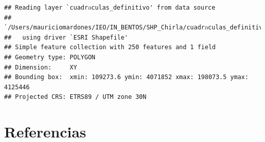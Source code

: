 \documentclass[
]{article}
\begin{document}
\begin{verbatim}
## Reading layer `cuadrกculas_definitivo' from data source 
##   `/Users/mauriciomardones/IEO/IN_BENTOS/SHP_Chirla/cuadrกculas_definitivo.shp' 
##   using driver `ESRI Shapefile'
## Simple feature collection with 250 features and 1 field
## Geometry type: POLYGON
## Dimension:     XY
## Bounding box:  xmin: 109273.6 ymin: 4071852 xmax: 198073.5 ymax: 4125446
## Projected CRS: ETRS89 / UTM zone 30N
\end{verbatim}

\hypertarget{referencias}{%
\section{Referencias}\label{referencias}}
\end{document}
